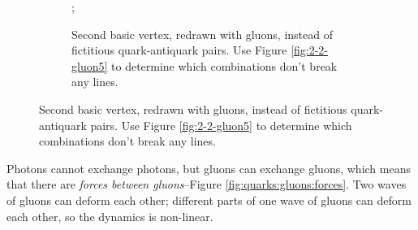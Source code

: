 \documentclass[]{article}
\begin{document}
\begin{figure}[H]
\begin{subfigure}[t]{0.40\textwidth}
	\end{subfigure}
	\em
	\begin{subfigure}[t]{0.45\textwidth}
		\caption{Second basic vertex, redrawn with gluons, instead of fictitious quark-antiquark pairs. Use Figure \ref{fig:2-2-gluon5} to determine which combinations don't break any lines.}\label{fig:2-2-gluon6}
		;
	\end{subfigure}
\end{figure}

Photons cannot exchange photons, but gluons can exchange gluons, which means that there are \emph{forces between gluons}--Figure \ref{fig:quarks:gluons:forces}. Two waves of gluons can deform each other; different parts of one wave of gluons can deform each other, so the dynamics is non-linear.
\end{document}
